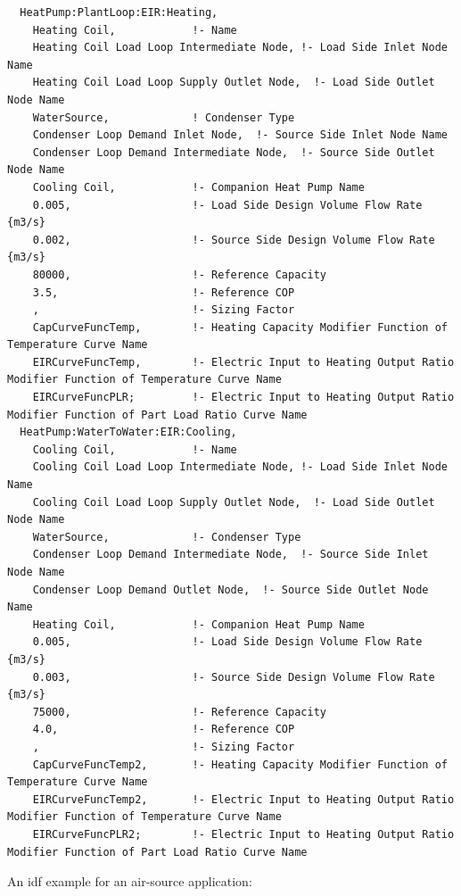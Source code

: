\begin{lstlisting}
  HeatPump:PlantLoop:EIR:Heating,
    Heating Coil,            !- Name
    Heating Coil Load Loop Intermediate Node, !- Load Side Inlet Node Name
    Heating Coil Load Loop Supply Outlet Node,  !- Load Side Outlet Node Name
    WaterSource,             ! Condenser Type
    Condenser Loop Demand Inlet Node,  !- Source Side Inlet Node Name
    Condenser Loop Demand Intermediate Node,  !- Source Side Outlet Node Name
    Cooling Coil,            !- Companion Heat Pump Name
    0.005,                   !- Load Side Design Volume Flow Rate {m3/s}
    0.002,                   !- Source Side Design Volume Flow Rate {m3/s}
    80000,                   !- Reference Capacity
    3.5,                     !- Reference COP
    ,                        !- Sizing Factor
    CapCurveFuncTemp,        !- Heating Capacity Modifier Function of Temperature Curve Name
    EIRCurveFuncTemp,        !- Electric Input to Heating Output Ratio Modifier Function of Temperature Curve Name
    EIRCurveFuncPLR;         !- Electric Input to Heating Output Ratio Modifier Function of Part Load Ratio Curve Name
  HeatPump:WaterToWater:EIR:Cooling,
    Cooling Coil,            !- Name
    Cooling Coil Load Loop Intermediate Node, !- Load Side Inlet Node Name
    Cooling Coil Load Loop Supply Outlet Node,  !- Load Side Outlet Node Name
    WaterSource,             !- Condenser Type
    Condenser Loop Demand Intermediate Node,  !- Source Side Inlet Node Name
    Condenser Loop Demand Outlet Node,  !- Source Side Outlet Node Name
    Heating Coil,            !- Companion Heat Pump Name
    0.005,                   !- Load Side Design Volume Flow Rate {m3/s}
    0.003,                   !- Source Side Design Volume Flow Rate {m3/s}
    75000,                   !- Reference Capacity
    4.0,                     !- Reference COP
    ,                        !- Sizing Factor
    CapCurveFuncTemp2,       !- Heating Capacity Modifier Function of Temperature Curve Name
    EIRCurveFuncTemp2,       !- Electric Input to Heating Output Ratio Modifier Function of Temperature Curve Name
    EIRCurveFuncPLR2;        !- Electric Input to Heating Output Ratio Modifier Function of Part Load Ratio Curve Name
\end{lstlisting}

An idf example for an air-source application:

